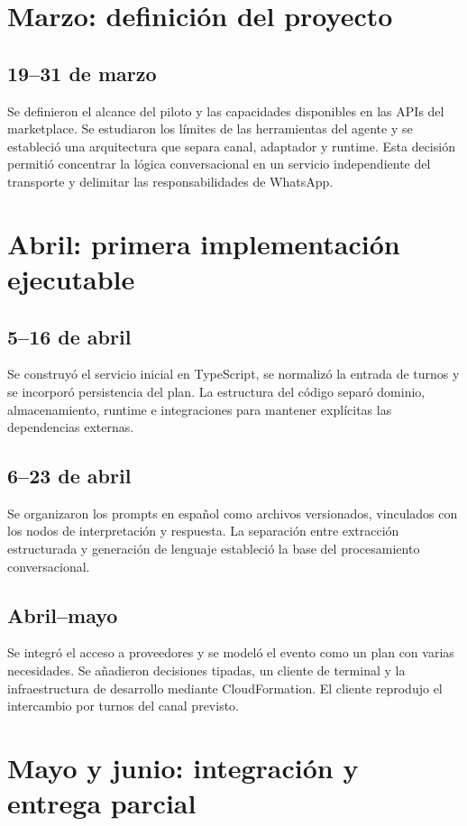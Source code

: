 \documentclass[
	a4paper,
	12pt,
]{CSSullivanBusinessReport}
\begin{document}
\section{Marzo: definición del proyecto}
\subsection*{19--31 de marzo}
Se definieron el alcance del piloto y las capacidades disponibles en las APIs del marketplace. Se estudiaron los límites de las herramientas del agente y se estableció una arquitectura que separa canal, adaptador y runtime. Esta decisión permitió concentrar la lógica conversacional en un servicio independiente del transporte y delimitar las responsabilidades de WhatsApp.

\section{Abril: primera implementación ejecutable}
\subsection*{5--16 de abril}
Se construyó el servicio inicial en TypeScript, se normalizó la entrada de turnos y se incorporó persistencia del plan. La estructura del código separó dominio, almacenamiento, runtime e integraciones para mantener explícitas las dependencias externas.

\subsection*{6--23 de abril}
Se organizaron los prompts en español como archivos versionados, vinculados con los nodos de interpretación y respuesta. La separación entre extracción estructurada y generación de lenguaje estableció la base del procesamiento conversacional.

\subsection*{Abril--mayo}
Se integró el acceso a proveedores y se modeló el evento como un plan con varias necesidades. Se añadieron decisiones tipadas, un cliente de terminal y la infraestructura de desarrollo mediante CloudFormation. El cliente reprodujo el intercambio por turnos del canal previsto.

\section{Mayo y junio: integración y entrega parcial}
\end{document}
